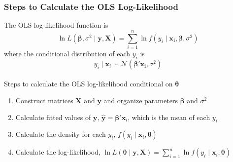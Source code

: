 \documentclass{beamer}\usepackage[]{graphicx}\usepackage[]{xcolor}
\begin{document}
\begin{frame}\frametitle{Steps to Calculate the OLS Log-Likelihood}
    The OLS log-likelihood function is
    $$\ln L(\bm{\beta}, \sigma^2 \mid \bm{y}, \bm{X}) = \sum_{i = 1}^n \ln f(y_i \mid \bm{x_i}, \bm{\beta}, \sigma^2)$$
    where the conditional distribution of each $y_i$ is
    $$y_i \mid \bm{x}_i \sim \mathcal{N}(\bm{\beta}' \bm{x_i}, \sigma^2)$$ \\
    \vspace{2ex}
    Steps to calculate the OLS log-likelihood conditional on $\bm{\theta}$
    \begin{enumerate}
        \item Construct matrices $\bm{X}$ and $\bm{y}$ and organize parameters $\bm{\beta}$ and $\sigma^2$
        \item Calculate fitted values of $\bm{y}$, $\widehat{\bm{y}} = \bm{\beta}' \bm{x}_i$, which is the mean of each $y_i$
        \item Calculate the density for each $y_i$, $f(y_i \mid \bm{x}_i, \bm{\theta})$
        \item Calculate the log-likelihood, $\ln L(\bm{\theta} \mid \bm{y}, \bm{X}) = \sum_{i = 1}^n \ln f(y_i \mid \bm{x}_i, \bm{\theta})$
    \end{enumerate}
\end{frame}
\end{document}
